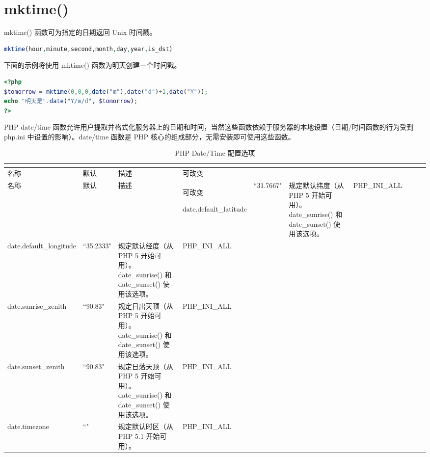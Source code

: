 \section{mktime()}


mktime() 函数可为指定的日期返回 Unix 时间戳。

\begin{lstlisting}[language=PHP]
mktime(hour,minute,second,month,day,year,is_dst)
\end{lstlisting}

下面的示例将使用 mktime() 函数为明天创建一个时间戳。


\begin{lstlisting}[language=PHP]
<?php
$tomorrow = mktime(0,0,0,date("m"),date("d")+1,date("Y"));
echo "明天是".date("Y/m/d", $tomorrow);
?>
\end{lstlisting}

PHP date/time 函数允许用户提取并格式化服务器上的日期和时间，当然这些函数依赖于服务器的本地设置（日期/时间函数的行为受到 php.ini 中设置的影响）。date/time 函数是 PHP 核心的组成部分，无需安装即可使用这些函数。


\begin{longtable}{|m{90pt}|m{40pt}|m{180pt}|m{60pt}|}
\tabularnewline\hline
名称	&默认	&描述	&可改变
\endhead

\caption{PHP Date/Time 配置选项}\\
\hline
名称	&默认	&描述	&可改变
\endfirsthead

\endfoot

\endlastfoot

\hline
date.default\_latitude	 &``31.7667"	&规定默认纬度（从 PHP 5 开始可用）。date\_sunrise() 和 date\_sunset() 使用该选项。	&PHP\_INI\_ALL\\
\hline
date.default\_longitude	&``35.2333"	&规定默认经度（从 PHP 5 开始可用）。date\_sunrise() 和 date\_sunset() 使用该选项。	&PHP\_INI\_ALL\\
\hline
date.sunrise\_zenith		&``90.83"	&规定日出天顶（从 PHP 5 开始可用）。date\_sunrise() 和 date\_sunset() 使用该选项。	&PHP\_INI\_ALL\\
\hline
date.sunset\_zenith		&``90.83"	&规定日落天顶（从 PHP 5 开始可用）。date\_sunrise() 和 date\_sunset() 使用该选项。	&PHP\_INI\_ALL\\
\hline
date.timezone			&``"	&规定默认时区（从 PHP 5.1 开始可用）。	&PHP\_INI\_ALL\\
\hline
\end{longtable}







